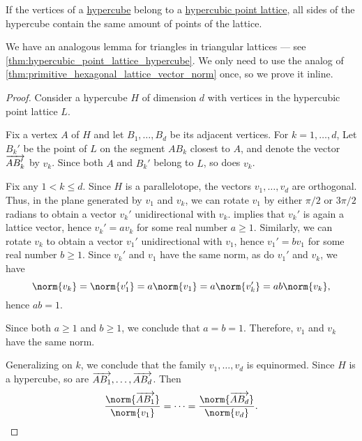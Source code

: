 \begin{lemma}\label{thm:hypercubic_point_lattice_hypercube}
  If the vertices of a \hyperref[def:hypercube]{hypercube} belong to a \hyperref[def:hypercubic_point_lattice]{hypercubic point lattice}, all sides of the hypercube contain the same amount of points of the lattice.
\end{lemma}
\begin{comments}
  \item We have an analogous lemma for triangles in triangular lattices --- see \cref{thm:hypercubic_point_lattice_hypercube}. We only need to use the analog of \cref{thm:primitive_hexagonal_lattice_vector_norm} once, so we prove it inline.
\end{comments}
\begin{proof}
  Consider a hypercube \( H \) of dimension \( d \) with vertices in the hypercubic point lattice \( L \).

  Fix a vertex \( A \) of \( H \) and let \( B_1, \ldots, B_d \) be its adjacent vertices. For \( k = 1, \ldots, d \), Let \( B_k' \) be the point of \( L \) on the segment \( A B_k \) closest to \( A \), and denote the vector \( \overrightarrow{A B_k'} \) by \( v_k \). Since both \( A \) and \( B_k' \) belong to \( L \), so does \( v_k \).

  Fix any \( 1 < k \leq d \). Since \( H \) is a parallelotope, the vectors \( v_1, \ldots, v_d \) are orthogonal. Thus, in the plane generated by \( v_1 \) and \( v_k \), we can rotate \( v_1 \) by either \( \pi / 2 \) or \( 3\pi / 2 \) radians to obtain a vector \( v_k' \) unidirectional with \( v_k \).  implies that \( v_k' \) is again a lattice vector, hence \( v_k' = a v_k \) for some real number \( a \geq 1 \). Similarly, we can rotate \( v_k \) to obtain a vector \( v_1' \) unidirectional with \( v_1 \), hence \( v_1' = b v_1 \) for some real number \( b \geq 1 \). Since \( v_k' \) and \( v_1 \) have the same norm, as do \( v_1' \) and \( v_k \), we have
  \begin{equation*}
    \norm{v_k} = \norm{v_1'} = a \norm{v_1} = a \norm{v_k'} = ab \norm{v_k},
  \end{equation*}
  hence \( ab = 1 \).

  Since both \( a \geq 1 \) and \( b \geq 1 \), we conclude that \( a = b = 1 \). Therefore, \( v_1 \) and \( v_k \) have the same norm.

  Generalizing on \( k \), we conclude that the family \( v_1, \ldots, v_d \) is equinormed. Since \( H \) is a hypercube, so are \( \overrightarrow{AB_1}, \ldots, \overrightarrow{AB_d} \). Then
  \begin{equation*}
    \frac {\norm{\vect{A B_1}}} {\norm{v_1}} = \cdots = \frac {\norm{\vect{A B_d}}} {\norm{v_d}}.
  \end{equation*}


\end{proof}
